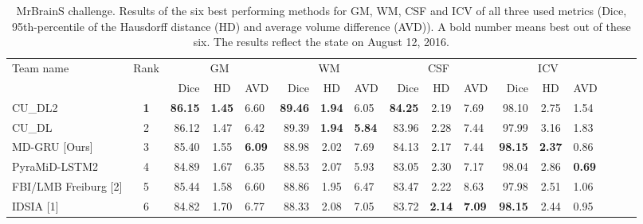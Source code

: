 \documentclass[a4paper,9pt]{llncs}
\begin{document}
\begin{table}
\begin{center}
 \caption{MrBrainS challenge. Results of the six best performing methods for GM, WM, CSF and ICV of all three used metrics (Dice, 95th-percentile of the Hausdorff distance (HD) and average volume difference (AVD)). A bold number means best out of these six. The results reflect the state on August 12, 2016.}
\label{mrbrainsres}
 \scriptsize
\begin{tabular}{l c rcl rcl rcl rcl rcl}
\toprule
Team name &  Rank &\multicolumn{3}{c}{GM} & \multicolumn{3}{c}{WM} & \multicolumn{3}{c}{CSF} &  \multicolumn{3}{c}{ICV}\\%
&  & Dice & HD & AVD & Dice & HD & AVD & Dice & HD & AVD & Dice & HD & AVD \\\midrule
CU\_DL2  & \textbf{1}& \textbf{86.15} & \textbf{1.45} & 6.60 & \textbf{89.46} & \textbf{1.94} & 6.05 & \textbf{84.25}& 2.19 & 7.69 &  98.10 & 2.75 & 1.54\\
CU\_DL& 2  & 86.12 & 1.47 & 6.42 & 89.39 & \textbf{1.94} & \textbf{5.84} & 83.96 & 2.28 & 7.44 &  97.99 & 3.16 & 1.83 \\
MD-GRU [Ours] & 3 & 85.40 & 1.55 & \textbf{6.09} & 88.98 & 2.02 & 7.69 & 84.13 & 2.17 & 7.44 & \textbf{98.15} & \textbf{2.37} & 0.86\\
PyraMiD-LSTM2 & 4 & 84.89 & 1.67 & 6.35 & 88.53 & 2.07 & 5.93 & 83.05 & 2.30 & 7.17 &  98.04 & 2.86 & \textbf{0.69}\\
FBI/LMB Freiburg [2]& 5 & 85.44 & 1.58 & 6.60 & 88.86 & 1.95 & 6.47 & 83.47 & 2.22 & 8.63 &  97.98 & 2.51 & 1.06\\
IDSIA [1]& 6 & 84.82 & 1.70 & 6.77 & 88.33 & 2.08 & 7.05& 83.72 & \textbf{2.14} & \textbf{7.09}& \textbf{98.15} & 2.44 & 0.95\\\bottomrule
\end{tabular}
\end{center}
 \label{resultschallenge}
\end{table}
\end{document}
